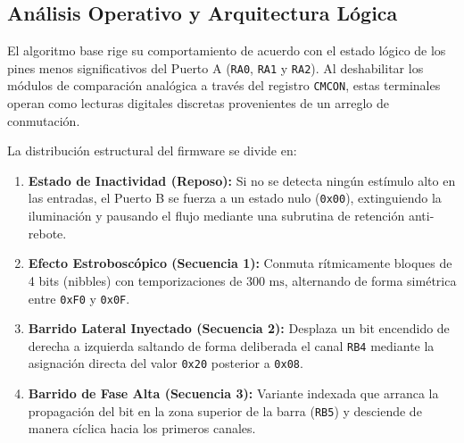 \subsection{Análisis Operativo y Arquitectura Lógica}
El algoritmo base rige su comportamiento de acuerdo con el estado lógico de los pines menos significativos del Puerto A (\texttt{RA0}, \texttt{RA1} y \texttt{RA2}). Al deshabilitar los módulos de comparación analógica a través del registro \texttt{CMCON}, estas terminales operan como lecturas digitales discretas provenientes de un arreglo de conmutación.

La distribución estructural del firmware se divide en:
\begin{enumerate}
    \item \textbf{Estado de Inactividad (Reposo):} Si no se detecta ningún estímulo alto en las entradas, el Puerto B se fuerza a un estado nulo (\texttt{0x00}), extinguiendo la iluminación y pausando el flujo mediante una subrutina de retención anti-rebote.
    \item \textbf{Efecto Estroboscópico (Secuencia 1):} Conmuta rítmicamente bloques de 4 bits (nibbles) con temporizaciones de $300\text{ ms}$, alternando de forma simétrica entre \texttt{0xF0} y \texttt{0x0F}.
    \item \textbf{Barrido Lateral Inyectado (Secuencia 2):} Desplaza un bit encendido de derecha a izquierda saltando de forma deliberada el canal \texttt{RB4} mediante la asignación directa del valor \texttt{0x20} posterior a \texttt{0x08}.
    \item \textbf{Barrido de Fase Alta (Secuencia 3):} Variante indexada que arranca la propagación del bit en la zona superior de la barra (\texttt{RB5}) y desciende de manera cíclica hacia los primeros canales.
\end{enumerate}

